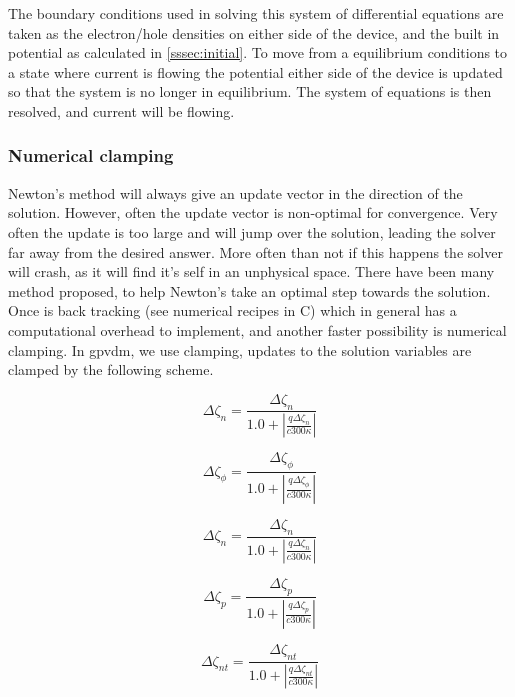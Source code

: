 \documentclass[11pt]{article}
\begin{document}
The boundary conditions used in solving this system of differential equations are taken as the electron/hole densities on either side of the device, and the built in potential as calculated in  \ref{sssec:initial}.  To move from a equilibrium conditions to a state where current is flowing the potential either side of the device is updated so that the system is no longer in equilibrium.  The system of equations is then resolved, and current will be flowing.

\subsubsection{Numerical clamping}
Newton's method will always give an update vector in the direction of the solution.  However, often the update vector is non-optimal for convergence.  Very often the update is too large and will jump over the solution, leading the solver far away from the desired answer.  More often than not if this happens the solver will crash, as it will find it's self in an unphysical space.  There have been many method proposed, to help Newton's take an optimal step towards the solution.  Once is back tracking (see numerical recipes in C) which in general has a computational overhead to implement, and another faster possibility is numerical clamping.  In gpvdm, we use clamping, updates to the solution variables are clamped by the following scheme.

\begin{equation}
\Delta \zeta_n=\frac{\Delta \zeta_n}{1.0+|\frac{q \Delta \zeta_n}{c300\kappa}|}
\end{equation}

\begin{equation}
\Delta \zeta_{\phi}=\frac{\Delta \zeta_{\phi}}{1.0+|\frac{q \Delta \zeta_{\phi}}{c300\kappa}|}
\end{equation}

\begin{equation}
\Delta \zeta_{n}=\frac{\Delta \zeta_{n}}{1.0+|\frac{q \Delta \zeta_{n}}{c300\kappa}|}
\end{equation}

\begin{equation}
\Delta \zeta_{p}=\frac{\Delta \zeta_{p}}{1.0+|\frac{q \Delta \zeta_{p}}{c300\kappa}|}
\end{equation}

\begin{equation}
\Delta \zeta_{nt}=\frac{\Delta \zeta_{nt}}{1.0+|\frac{q \Delta \zeta_{nt}}{c300\kappa}|}
\end{equation}
\end{document}
